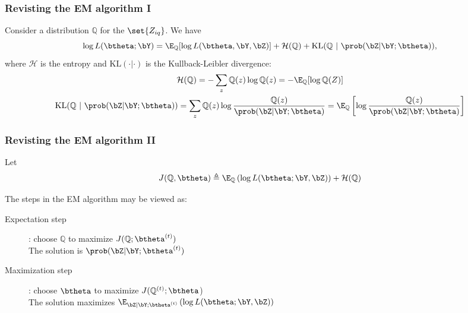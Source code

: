 \documentclass{beamer}\usepackage[]{graphicx}\usepackage[]{color}
\begin{document}
\begin{frame}
  \frametitle{Revisting the EM algorithm I}

  \begin{proposition}
    Consider a distribution $\mathbb{Q}$ for the $\set{Z_{iq}}$. We have
    \begin{equation*}
      \log L(\btheta; \bY) = \E_{\mathbb{Q}} [\log L(\btheta, \bY,\bZ)] + \mathcal{H}(\mathbb{Q}) + \mathrm{KL}(\mathbb{Q} \ | \ \prob(\bZ|\bY;\btheta)),
    \end{equation*}
    where $\mathcal{H}$ is the entropy and $\mathrm{KL}( \cdot| \cdot)$ is the Kullback-Leibler divergence:
    \begin{gather*}
      \mathcal{H}(\mathbb{Q}) = - \sum_z \mathbb{Q}(z) \log \mathbb{Q}(z) = - \E_\mathbb{Q} [\log \mathbb{Q} (Z)]\\
      \mathrm{KL}(\mathbb{Q} \ | \ \prob(\bZ|\bY;\btheta)) = \sum_z \mathbb{Q}(z) \log \frac{\mathbb{Q}(z)}{\prob(\bZ|\bY;\btheta)} = \E_\mathbb{Q} \left[\log \frac{\mathbb{Q}(z)}{\prob(\bZ|\bY;\btheta)}\right]\\
    \end{gather*}
  \end{proposition}
\end{frame}

\begin{frame}
  \frametitle{Revisting the EM algorithm II}
  Let
   \begin{equation*}
    J(\mathbb{Q},\btheta) \triangleq \E_{\mathbb{Q}}\left(\log L(\btheta ;\bY,\bZ)\right) + \mathcal{H}(\mathbb{Q})
\end{equation*}

  \vfill

  The steps in the EM algorithm may be viewed as:
  \begin{description}
    \item[Expectation step]: choose $\mathbb{Q}$ to maximize $J(\mathbb{Q};\btheta^{(t)})$\\[2ex]
      \alert{The solution is $\prob(\bZ|\bY;\btheta^{(t)})$}\\
    \item[Maximization step]: choose $\btheta$ to maximize $J(\mathbb{Q}^{(t)};\btheta$)\\[2ex]
      \alert{The solution maximizes $\E_{\bZ|\bY;\btheta^{(t)}}\left(\log L(\btheta ;\bY,\bZ)\right)$}
  \end{description}

\end{frame}
\end{document}
